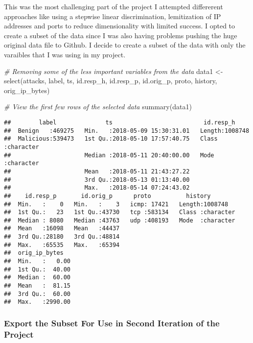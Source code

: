 \documentclass[
]{article}
\newenvironment{Shaded}{\begin{snugshade}}{\end{snugshade}}
\newcommand{\CommentTok}[1]{\textcolor[rgb]{0.56,0.35,0.01}{\textit{#1}}}
\newcommand{\FunctionTok}[1]{\textcolor[rgb]{0.00,0.00,0.00}{#1}}
\newcommand{\NormalTok}[1]{#1}
\newcommand{\OtherTok}[1]{\textcolor[rgb]{0.56,0.35,0.01}{#1}}
\begin{document}
This was the most challenging part of the project I attempted
differerent approaches like using a stepwise linear discrimination,
lemitization of IP addresses and ports to reduce dimensionality with
limited success. I opted to create a subset of the data since I was also
having problems pushing the huge original data file to Github. I decide
to create a subset of the data with only the varaibles that I was using
in my project.

\begin{Shaded}
\begin{Highlighting}[]
\CommentTok{\# Removing some of the less  important variables from the data }
\NormalTok{data1 }\OtherTok{\textless{}{-}} \FunctionTok{select}\NormalTok{(attacks, }
\NormalTok{                        label, ts, }
\NormalTok{                        id.resp\_h, id.resp\_p, id.orig\_p,}
\NormalTok{                        proto, history, orig\_ip\_bytes)}

\CommentTok{\# View the first few rows of the selected data}
\FunctionTok{summary}\NormalTok{(data1)}
\end{Highlighting}
\end{Shaded}

\begin{verbatim}
##        label              ts                          id.resp_h        
##  Benign   :469275   Min.   :2018-05-09 15:30:31.01   Length:1008748    
##  Malicious:539473   1st Qu.:2018-05-10 17:57:40.75   Class :character  
##                     Median :2018-05-11 20:40:00.00   Mode  :character  
##                     Mean   :2018-05-11 21:43:27.22                     
##                     3rd Qu.:2018-05-13 01:13:40.00                     
##                     Max.   :2018-05-14 07:24:43.02                     
##    id.resp_p       id.orig_p      proto          history         
##  Min.   :    0   Min.   :    3   icmp: 17421   Length:1008748    
##  1st Qu.:   23   1st Qu.:43730   tcp :583134   Class :character  
##  Median : 8080   Median :43763   udp :408193   Mode  :character  
##  Mean   :16098   Mean   :44437                                   
##  3rd Qu.:28180   3rd Qu.:48814                                   
##  Max.   :65535   Max.   :65394                                   
##  orig_ip_bytes    
##  Min.   :   0.00  
##  1st Qu.:  40.00  
##  Median :  60.00  
##  Mean   :  81.15  
##  3rd Qu.:  60.00  
##  Max.   :2990.00
\end{verbatim}

\hypertarget{export-the-subset-for-use-in-second-iteration-of-the-project}{%
\subsubsection{Export the Subset For Use in Second Iteration of the
Project}\label{export-the-subset-for-use-in-second-iteration-of-the-project}}
\end{document}

